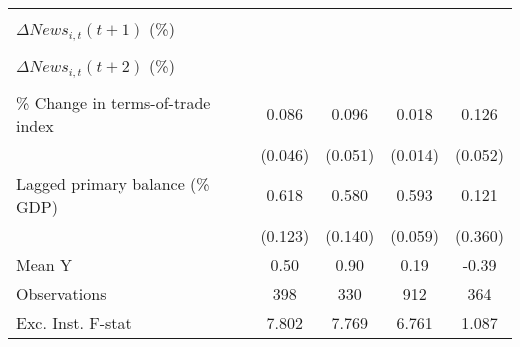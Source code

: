 {\begin{tabular}{l*{4}{c}}
                    &                     &                     &                     &                     \\
\addlinespace
$ \Delta News_{i,t}(t+1)$ (\%)&                     &                     &                     &                     \\
                    &                     &                     &                     &                     \\
\addlinespace
$ \Delta News_{i,t}(t+2)$ (\%)&                     &                     &                     &                     \\
                    &                     &                     &                     &                     \\
\addlinespace
\% Change in terms-of-trade index&       0.086\sym{*}  &       0.096\sym{*}  &       0.018         &       0.126\sym{**} \\
                    &     (0.046)         &     (0.051)         &     (0.014)         &     (0.052)         \\
\addlinespace
Lagged primary balance (\% GDP)&       0.618\sym{***}&       0.580\sym{***}&       0.593\sym{***}&       0.121         \\
                    &     (0.123)         &     (0.140)         &     (0.059)         &     (0.360)         \\
\midrule
Mean Y              &        0.50         &        0.90         &        0.19         &       -0.39         \\
Observations        &         398         &         330         &         912         &         364         \\
Exc. Inst. F-stat   &       7.802         &       7.769         &       6.761         &       1.087         \\
\bottomrule
\end{tabular}
}
